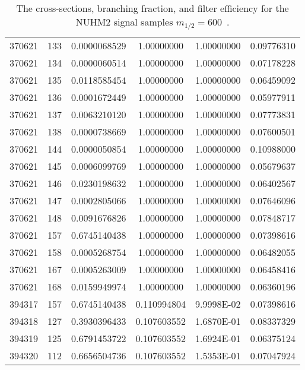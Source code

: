 \begin{table}[htp]
{{\begin{tabular}{cccccc}
                370621 & 133         & 0.0000068529         & 1.00000000  & 1.00000000        & 0.09776310\\
                370621 & 134         & 0.0000060514         & 1.00000000  & 1.00000000        & 0.07178228\\
                370621 & 135         & 0.0118585454         & 1.00000000  & 1.00000000        & 0.06459092\\
                370621 & 136         & 0.0001672449         & 1.00000000  & 1.00000000        & 0.05977911\\
                370621 & 137         & 0.0063210120         & 1.00000000  & 1.00000000        & 0.07773831\\
                370621 & 138         & 0.0000738669         & 1.00000000  & 1.00000000        & 0.07600501\\
                370621 & 144         & 0.0000050854         & 1.00000000  & 1.00000000        & 0.10988000\\
                370621 & 145         & 0.0006099769         & 1.00000000  & 1.00000000        & 0.05679637\\
                370621 & 146         & 0.0230198632         & 1.00000000  & 1.00000000        & 0.06402567\\
                370621 & 147         & 0.0002805066         & 1.00000000  & 1.00000000        & 0.07646096\\
                370621 & 148         & 0.0091676826         & 1.00000000  & 1.00000000        & 0.07848717\\
                370621 & 157         & 0.6745140438         & 1.00000000  & 1.00000000        & 0.07398616\\
                370621 & 158         & 0.0005268754         & 1.00000000  & 1.00000000        & 0.06482055\\
                370621 & 167         & 0.0005263009         & 1.00000000  & 1.00000000        & 0.06458416\\
                370621 & 168         & 0.0159949974         & 1.00000000  & 1.00000000        & 0.06360196\\
                394317 & 157         & 0.6745140438         & 0.110994804 & 9.9998E-02        & 0.07398616\\
                394318 & 127         & 0.3930396433         & 0.107603552 & 1.6870E-01        & 0.08337329\\
                394319 & 125         & 0.6791453722         & 0.107603552 & 1.6924E-01        & 0.06375124\\
                394320 & 112         & 0.6656504736         & 0.107603552 & 1.5353E-01        & 0.07047924\\
                \hline
                \hline
            \end{tabular}
        }
    }
    \caption{The cross-sections, branching fraction, and filter efficiency for the NUHM2 signal samples $m_{1/2} = 600$~{\GeV}.}
    \label{tab:app_xsec_m12_600}
\end{table}%

